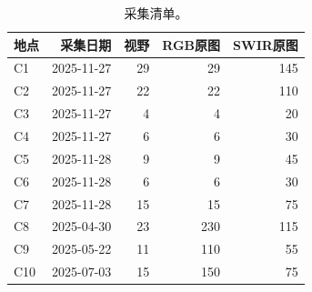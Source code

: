 \begin{table}[htbp]\centering\small
\caption{采集清单。}
\label{tab:acquisition-zh}
\begin{tabular}{lrrrr}\toprule
地点 & 采集日期 & 视野 & RGB原图 & SWIR原图\\\midrule
C1 & 2025-11-27 & 29 & 29 & 145\\
C2 & 2025-11-27 & 22 & 22 & 110\\
C3 & 2025-11-27 & 4 & 4 & 20\\
C4 & 2025-11-27 & 6 & 6 & 30\\
C5 & 2025-11-28 & 9 & 9 & 45\\
C6 & 2025-11-28 & 6 & 6 & 30\\
C7 & 2025-11-28 & 15 & 15 & 75\\
C8 & 2025-04-30 & 23 & 230 & 115\\
C9 & 2025-05-22 & 11 & 110 & 55\\
C10 & 2025-07-03 & 15 & 150 & 75\\
\bottomrule\end{tabular}\end{table}